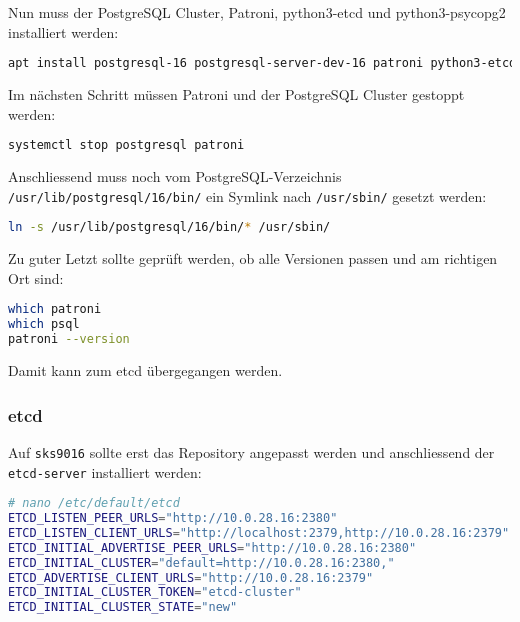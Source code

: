 \begin{flushleft}
    Nun muss der \Gls{PostgreSQL Cluster}, Patroni, python3-etcd und python3-psycopg2 installiert werden:
\lstset{style=gra_codestyle}
\begin{lstlisting}[language=bash, caption=Patroni - Prerequisites installieren,captionpos=b,label={lst:patroni-prerequisites-install},breaklines=true]
apt install postgresql-16 postgresql-server-dev-16 patroni python3-etcd python3-psycopg2
\end{lstlisting}
    Im nächsten Schritt müssen Patroni und der \Gls{PostgreSQL Cluster} gestoppt werden:
\lstset{style=gra_codestyle}
\begin{lstlisting}[language=bash, caption=Patroni - Stop Patroni / PostgreSQL,captionpos=b,label={lst:patroni-stop-postgresql-patroni},breaklines=true]
systemctl stop postgresql patroni
\end{lstlisting}
    Anschliessend muss noch vom PostgreSQL-Verzeichnis \texttt{/usr/lib/postgresql/16/bin/} ein Symlink nach \texttt{/usr/sbin/} gesetzt werden:
\lstset{style=gra_codestyle}
\begin{lstlisting}[language=bash, caption=Patroni - Symlink bin,captionpos=b,label={lst:patroni-symlink-bin},breaklines=true]
ln -s /usr/lib/postgresql/16/bin/* /usr/sbin/
\end{lstlisting}
\end{flushleft}
\begin{flushleft}
    Zu guter Letzt sollte geprüft werden, ob alle Versionen passen und am richtigen Ort sind:
\lstset{style=gra_codestyle}
\begin{lstlisting}[language=bash, caption=Patroni - Checks,captionpos=b,label={lst:patroni-checks},breaklines=true]
which patroni
which psql
patroni --version
\end{lstlisting}
    Damit kann zum \gls{etcd} übergegangen werden.
\end{flushleft}
\begin{flushleft}
    \subsubsection{\gls{etcd}}
    Auf \texttt{sks9016} sollte erst das Repository angepasst werden und anschliessend der \texttt{etcd-server} installiert werden:
\lstset{style=gra_codestyle}
\begin{lstlisting}[language=bash, caption=Patroni - etcd-server konfigurieren=b,label={lst:patroni-etcd-server-config},breaklines=true]
# nano /etc/default/etcd
ETCD_LISTEN_PEER_URLS="http://10.0.28.16:2380"
ETCD_LISTEN_CLIENT_URLS="http://localhost:2379,http://10.0.28.16:2379"
ETCD_INITIAL_ADVERTISE_PEER_URLS="http://10.0.28.16:2380"
ETCD_INITIAL_CLUSTER="default=http://10.0.28.16:2380,"
ETCD_ADVERTISE_CLIENT_URLS="http://10.0.28.16:2379"
ETCD_INITIAL_CLUSTER_TOKEN="etcd-cluster"
ETCD_INITIAL_CLUSTER_STATE="new"
\end{lstlisting}

\end{flushleft}
